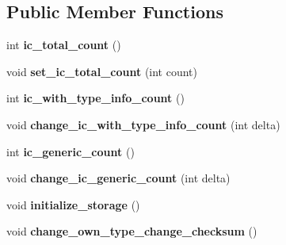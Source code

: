 \subsection*{Public Member Functions}
\begin{DoxyCompactItemize}
\item 
\hypertarget{classv8_1_1internal_1_1_type_feedback_info_aac28d6c8f9d02337ed4d52ba4d92b5b2}{}int {\bfseries ic\+\_\+total\+\_\+count} ()\label{classv8_1_1internal_1_1_type_feedback_info_aac28d6c8f9d02337ed4d52ba4d92b5b2}

\item 
\hypertarget{classv8_1_1internal_1_1_type_feedback_info_a709b68f591d63296511358f959a3a6a2}{}void {\bfseries set\+\_\+ic\+\_\+total\+\_\+count} (int count)\label{classv8_1_1internal_1_1_type_feedback_info_a709b68f591d63296511358f959a3a6a2}

\item 
\hypertarget{classv8_1_1internal_1_1_type_feedback_info_af3be8c479fc63db7572e066d4dff504d}{}int {\bfseries ic\+\_\+with\+\_\+type\+\_\+info\+\_\+count} ()\label{classv8_1_1internal_1_1_type_feedback_info_af3be8c479fc63db7572e066d4dff504d}

\item 
\hypertarget{classv8_1_1internal_1_1_type_feedback_info_aa97b72eaecbddff03b505441b533bfce}{}void {\bfseries change\+\_\+ic\+\_\+with\+\_\+type\+\_\+info\+\_\+count} (int delta)\label{classv8_1_1internal_1_1_type_feedback_info_aa97b72eaecbddff03b505441b533bfce}

\item 
\hypertarget{classv8_1_1internal_1_1_type_feedback_info_a6fa8a6e885ce7889f1c9d38b92901b09}{}int {\bfseries ic\+\_\+generic\+\_\+count} ()\label{classv8_1_1internal_1_1_type_feedback_info_a6fa8a6e885ce7889f1c9d38b92901b09}

\item 
\hypertarget{classv8_1_1internal_1_1_type_feedback_info_a6e1fbc7ad7122ba0079844977e1fb242}{}void {\bfseries change\+\_\+ic\+\_\+generic\+\_\+count} (int delta)\label{classv8_1_1internal_1_1_type_feedback_info_a6e1fbc7ad7122ba0079844977e1fb242}

\item 
\hypertarget{classv8_1_1internal_1_1_type_feedback_info_a8e606a54549bc6f0488d991c2e366d9e}{}void {\bfseries initialize\+\_\+storage} ()\label{classv8_1_1internal_1_1_type_feedback_info_a8e606a54549bc6f0488d991c2e366d9e}

\item 
\hypertarget{classv8_1_1internal_1_1_type_feedback_info_a43b977b2fbf51222543e47581e4d7a6f}{}void {\bfseries change\+\_\+own\+\_\+type\+\_\+change\+\_\+checksum} ()\label{classv8_1_1internal_1_1_type_feedback_info_a43b977b2fbf51222543e47581e4d7a6f}


\end{DoxyCompactItemize}
